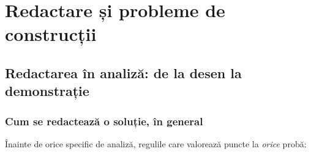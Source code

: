 \chapter{Redactare și probleme de construcții}






\section{Redactarea în analiză: de la desen la demonstrație}

\subsection{Cum se redactează o soluție, în general}

Înainte de orice specific de analiză, regulile care valorează puncte la \emph{orice} probă:

